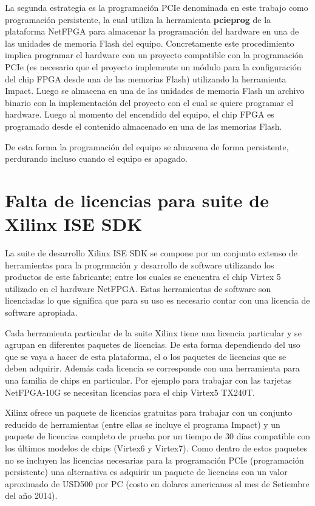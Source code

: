 La segunda estrategia es la programación PCIe denominada en este trabajo como programación persistente, la cual utiliza la herramienta \textbf{pcieprog} de la plataforma NetFPGA para almacenar la programaci\'on del hardware en una de las unidades de memoria Flash del equipo. Concretamente este procedimiento implica programar el hardware con un proyecto compatible con la programaci\'on PCIe (es necesario que el proyecto implemente un m\'odulo para la configuraci\'on del chip FPGA desde una de las memorias Flash) utilizando la herramienta Impact. Luego se almacena en una de las unidades de memoria Flash un archivo binario con la implementaci\'on del proyecto con el cual se quiere programar el hardware. Luego al momento del encendido del equipo, el chip FPGA es programado desde el contenido almacenado en una de las memorias Flash.

De esta forma la programaci\'on del equipo se almacena de forma persistente, perdurando incluso cuando el equipo es apagado.

\section{Falta de licencias para suite de Xilinx ISE SDK}
\label{apendiceB3}
La suite de desarrollo Xilinx ISE SDK se compone por un conjunto extenso de herramientas para la progrmaci\'on y desarrollo de software utilizando los productos de este fabricante; entre los cuales se encuentra el chip Virtex 5 utilizado en el hardware NetFPGA. Estas herramientas de software son licenciadas lo que significa que para su uso es necesario contar con una licencia de software apropiada.

Cada herramienta particular de la suite Xilinx tiene una licencia particular y se agrupan en diferentes paquetes de licencias. De esta forma dependiendo del uso que se vaya a hacer de esta plataforma, el o los paquetes de licencias que se deben adquirir. Adem\'as cada licencia se corresponde con una herramienta para una familia de chips en particular. Por ejemplo para trabajar con las tarjetas NetFPGA-10G se necesitan licencias para el chip Virtex5 TX240T.

Xilinx ofrece un paquete de licencias gratuitas para trabajar con un conjunto reducido de herramientas (entre ellas se incluye el programa Impact) y un paquete de licencias completo de prueba por un tiempo de 30 d\'ias compatible con los \'ultimos modelos de chips (Virtex6 y Virtex7). Como dentro de estos paquetes no se incluyen las licencias necesarias para la programaci\'on PCIe (programaci\'on persistente) una alternativa es adquirir un paquete de licencias con un valor aproximado de USD500 por PC (costo en dolares americanos al mes de Setiembre del año 2014).

